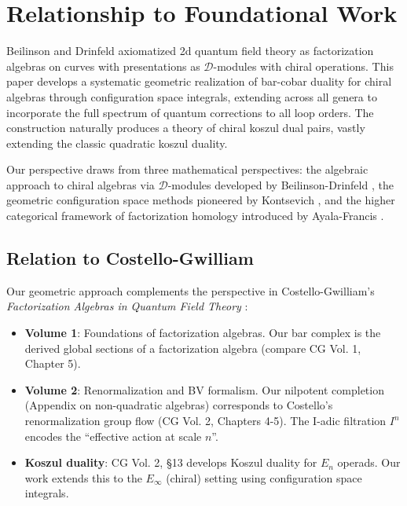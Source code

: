 \section{Relationship to Foundational Work}

Beilinson and Drinfeld \cite{BD04} axiomatized 2d quantum field theory as factorization algebras on curves with presentations as $\mathcal{D}$-modules with chiral operations. This paper develops a systematic geometric realization of bar-cobar duality for chiral algebras through configuration space integrals, extending across all genera to incorporate the full spectrum of quantum corrections to all loop orders. The construction naturally produces a theory of chiral koszul dual pairs, vastly extending the classic quadratic koszul duality.

Our perspective draws from three mathematical perspectives: the algebraic approach to chiral algebras via $\mathcal{D}$-modules developed by Beilinson-Drinfeld \cite{BD04}, the geometric configuration space methods pioneered by Kontsevich \cite{Kon94, Kon99}, and the higher categorical framework of factorization homology introduced by Ayala-Francis \cite{AF15}.

\subsection{Relation to Costello-Gwilliam}

Our geometric approach complements the perspective in Costello-Gwilliam's 
\textit{Factorization Algebras in Quantum Field Theory} \cite{CostelloGwilliam}:

\begin{itemize}
\item \textbf{Volume 1}: Foundations of factorization algebras. Our bar complex is 
the derived global sections of a factorization algebra (compare CG Vol. 1, Chapter 5).

\item \textbf{Volume 2}: Renormalization and BV formalism. Our nilpotent completion 
(Appendix on non-quadratic algebras) corresponds to Costello's renormalization 
group flow (CG Vol. 2, Chapters 4-5). The I-adic filtration $I^n$ encodes the 
``effective action at scale $n$''.

\item \textbf{Koszul duality}: CG Vol. 2, \S13 develops Koszul duality for $E_n$ 
operads. Our work extends this to the $E_\infty$ (chiral) setting using configuration 
space integrals.
\end{itemize}

